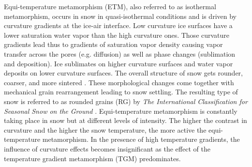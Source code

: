 \documentclass[draft,ms]{agujournal2019}
\begin{document}
Equi-temperature metamorphism (ETM), also referred to as isothermal metamorphism, occurs in snow in quasi-isothermal conditions and is driven by curvature gradients at the ice-air interface. Low curvature ice surfaces have a lower saturation water vapor than the high curvature ones. Those curvature gradients lead thus to gradients of saturation vapor density causing vapor transfer across the pores (e.g. diffusion) as well as phase changes (sublimation and deposition). Ice sublimates on higher curvature surfaces and  water vapor deposits on lower curvature surfaces. 
The overall structure of snow gets rounder, coarser, and more sintered \cite{colbeck_thermodynamics_1980}. These morphological changes come together with mechanical grain rearrangement leading to snow settling. The resulting type of snow is referred to as rounded grains (RG) by \textit{The International Classification for Seasonal Snow on the Ground} \cite{fierz2009international}. Equi-temperature metamorphism is constantly taking place in snow but at different levels of intensity. The higher the contrast in curvature and the higher the snow temperature, the more active the equi-temperature metamorphism. In the presence of high temperature gradients, the influence of curvature effects becomes insignificant as the effect of the temperature gradient metamorphism (TGM) predominates.\\
\end{document}
